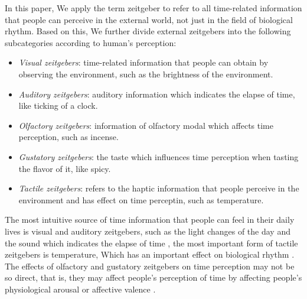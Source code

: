 \documentclass[sigconf]{acmart}
\begin{document}
In this paper, We apply the term zeitgeber to refer to all time-related information that people can perceive in the external world, not just in the field of biological rhythm. Based on this, We further divide external zeitgebers into the following subcategories according to human's perception:
\begin{itemize}
\item \emph{Visual zeitgebers}: time-related information that people can obtain by observing the environment, such as the brightness of the environment.
\item \emph{Auditory zeitgebers}: auditory information which indicates the elapse of time, like ticking of a clock.
\item \emph{Olfactory zeitgebers}: information of olfactory modal which affects time perception, such as incense.
\item \emph{Gustatory zeitgebers}: the taste which influences time perception when tasting the flavor of it, like spicy.
\item \emph{Tactile zeitgebers}: refers to the haptic information that people perceive in the environment and has effect on time perceptin, such as temperature.
\end{itemize}

The most intuitive source of time information that people can feel in their daily lives is visual and auditory zeitgebers, such as the light changes of the day \cite{duffy2005entrainment, pittendrigh1981circadian, fleissner20138, lopez2006light, aschoff1965circadian} and the sound which indicates the elapse of time \cite{noulhiane2007emotional}, the most important form of tactile zeitgebers is temperature, Which has an important effect on biological rhythm \cite{lopez2006light, aschoff1965circadian}. The effects of olfactory and gustatory zeitgebers on time perception may not be so direct, that is, they may affect people's perception of time by affecting people's physiological arousal or affective valence \cite{angrilli1997influence,burle2001dissociation,droit2007emotions}.
\end{document}
